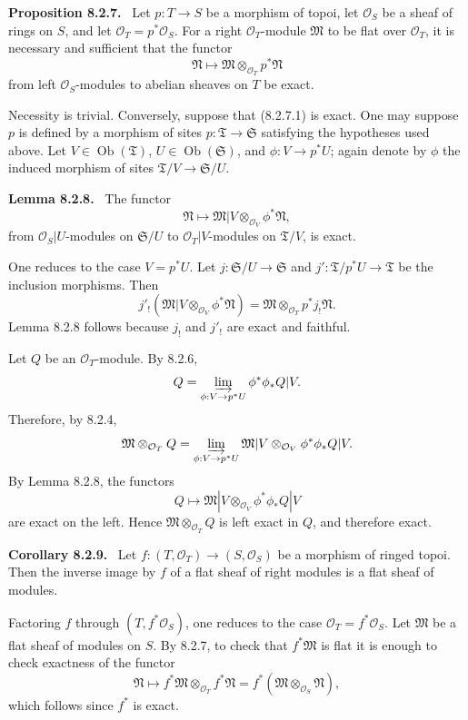 \documentclass[11pt]{article}
\newcommand{\ob}{\operatorname{Ob}}
\newcommand{\Ss}{\mathfrak{S}}
\newcommand{\Tt}{\mathfrak{T}}
\newcommand{\Mm}{\mathfrak{M}}
\newcommand{\Nn}{\mathfrak{N}}
\newcommand{\Oo}{\mathcal{O}}
\newenvironment{statement}[1]{\par\medskip\noindent\textbf{#1.}\ }{\par\medskip}
\begin{document}
\begin{statement}{Proposition 8.2.7}
Let $p:T\to S$ be a morphism of topoi, let $\Oo_S$ be a sheaf of rings on $S$, and let $\Oo_T=p^*\Oo_S$. For a right $\Oo_T$-module $\Mm$ to be flat over $\Oo_T$, it is necessary and sufficient that the functor
\begin{equation*}
        \Nn\longmapsto \Mm\otimes_{\Oo_T}p^*\Nn\tag{8.2.7.1}
\end{equation*}
from left $\Oo_S$-modules to abelian sheaves on $T$ be exact.
\end{statement}

Necessity is trivial. Conversely, suppose that (8.2.7.1) is exact. One may suppose $p$ is defined by a morphism of sites $p:\Tt\to\Ss$ satisfying the hypotheses used above. Let $V\in\ob(\Tt)$, $U\in\ob(\Ss)$, and $\phi:V\to p^*U$; again denote by $\phi$ the induced morphism of sites $\Tt/V\to\Ss/U$.

\begin{statement}{Lemma 8.2.8}
The functor
\[
        \Nn\longmapsto \Mm|V\otimes_{\Oo_V}\phi^*\Nn,
\]
from $\Oo_S|U$-modules on $\Ss/U$ to $\Oo_T|V$-modules on $\Tt/V$, is exact.
\end{statement}

One reduces to the case $V=p^*U$. Let $j:\Ss/U\to\Ss$ and $j':\Tt/p^*U\to\Tt$ be the inclusion morphisms. Then
\[
        j'_!(\Mm|V\otimes_{\Oo_V}\phi^*\Nn)
        =\Mm\otimes_{\Oo_T}p^*j_!\Nn.
\]
Lemma 8.2.8 follows because $j_!$ and $j'_!$ are exact and faithful.

Let $Q$ be an $\Oo_T$-module. By 8.2.6,
\[
        Q=\varinjlim_{\phi:V\to p^*U}\phi^*\phi_*Q|V.
\]
Therefore, by 8.2.4,
\[
\Mm\otimes_{\Oo_T}Q
 =\varinjlim_{\phi:V\to p^*U}
   \Mm|V\otimes_{\Oo_V}\phi^*\phi_*Q|V.
\]
By Lemma 8.2.8, the functors
\[
        Q\longmapsto \Mm|V\otimes_{\Oo_V}\phi^*\phi_*Q|V
\]
are exact on the left. Hence $\Mm\otimes_{\Oo_T}Q$ is left exact in $Q$, and therefore exact.

\begin{statement}{Corollary 8.2.9}
Let $f:(T,\Oo_T)\to(S,\Oo_S)$ be a morphism of ringed topoi. Then the inverse image by $f$ of a flat sheaf of right modules is a flat sheaf of modules.
\end{statement}

Factoring $f$ through $(T,f^*\Oo_S)$, one reduces to the case $\Oo_T=f^*\Oo_S$. Let $\Mm$ be a flat sheaf of modules on $S$. By 8.2.7, to check that $f^*\Mm$ is flat it is enough to check exactness of the functor
\[
        \Nn\longmapsto f^*\Mm\otimes_{\Oo_T}f^*\Nn
        =f^*(\Mm\otimes_{\Oo_S}\Nn),
\]
which follows since $f^*$ is exact.
\end{document}
